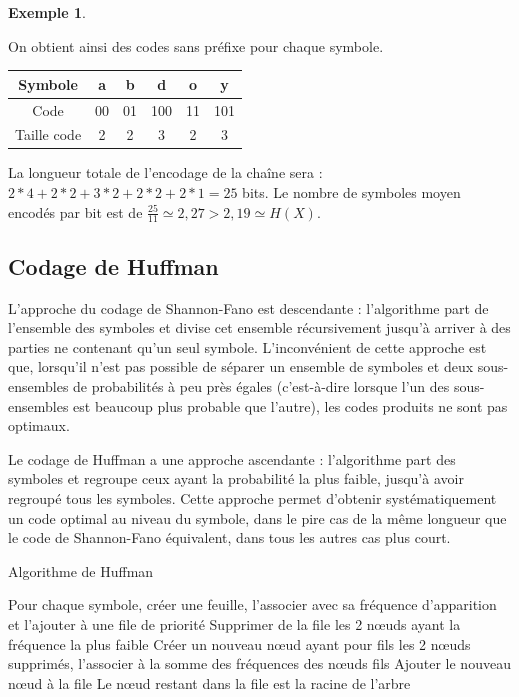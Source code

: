 \documentclass[10pt,a4paper]{article}
\theoremstyle{definition}
\newtheorem{example}{Exemple}
\numberwithin{lemma}{subsection}
\numberwithin{theorem}{subsection}
\numberwithin{definition}{subsection}
\numberwithin{proposition}{subsection}
\numberwithin{corollary}{subsection}
\numberwithin{property}{subsection}
\numberwithin{example}{subsection}
\numberwithin{heuristique}{subsection}
\numberwithin{scenario}{subsection}
\begin{document}
\begin{example}
\begin{center}
\begin{tikzpicture}[xscale=1,yscale=1]
\end{tikzpicture}
\end{center}
On obtient ainsi des codes sans préfixe pour chaque symbole.
\par\begin{tabular}{|c|c|c|c|c|c|}
\hline
Symbole & a & b & d & o & y \\
\hline
Code & 00 & 01 & 100 & 11 & 101 \\
\hline
Taille code & 2 & 2 & 3 & 2 & 3 \\
\hline
\end{tabular}
\par La longueur totale de l'encodage de la chaîne sera : $2*4 + 2*2 + 3*2 + 2*2 + 2*1 = 25$ bits. Le nombre de symboles moyen encodés par bit est de $\frac{25}{11} \simeq 2,27 > 2,19 \simeq H(X)$.
\end{example}

	\subsection{Codage de Huffman}

L'approche du codage de Shannon-Fano est descendante : l'algorithme part de l'ensemble des symboles et divise cet ensemble récursivement jusqu'à arriver à des parties ne contenant qu'un seul symbole. L'inconvénient de cette approche est que, lorsqu'il n'est pas possible de séparer un ensemble de symboles et deux sous-ensembles de probabilités à peu près égales (c'est-à-dire lorsque l'un des sous-ensembles est beaucoup plus probable que l'autre), les codes produits ne sont pas optimaux.
\par Le codage de Huffman a une approche ascendante : l'algorithme part des symboles et regroupe ceux ayant la probabilité la plus faible, jusqu'à avoir regroupé tous les symboles. Cette approche permet d'obtenir systématiquement un code optimal au niveau du symbole, dans le pire cas de la même longueur que le code de Shannon-Fano équivalent, dans tous les autres cas plus court.

\begin{algorithm}[H]
\caption{Algorithme de Huffman}
Pour chaque symbole, créer une feuille, l'associer avec sa fréquence d'apparition et l'ajouter à une file de priorité\;
{
	Supprimer de la file les 2 nœuds ayant la fréquence la plus faible\;
	Créer un nouveau nœud ayant pour fils les 2 nœuds supprimés, l'associer à la somme des fréquences des nœuds fils\;
	Ajouter le nouveau nœud à la file\;
}
Le nœud restant dans la file est la racine de l'arbre\;
\end{algorithm}
\end{document}
